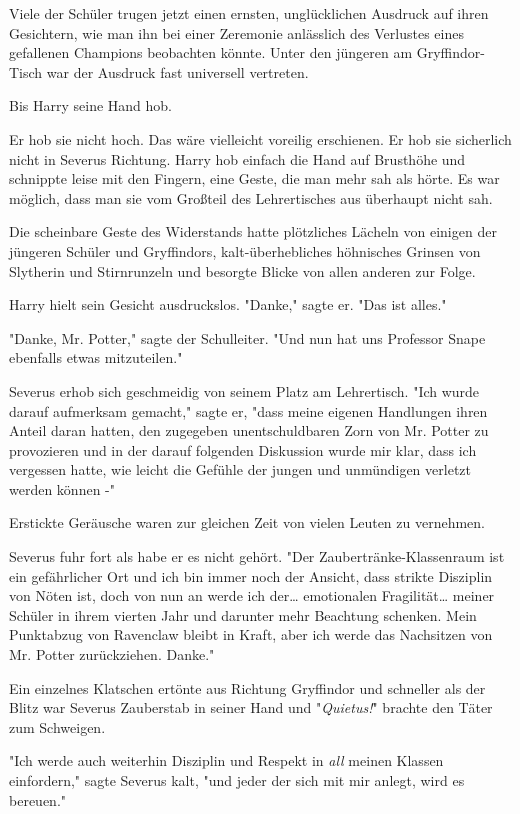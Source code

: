 {Viele der Schüler trugen jetzt einen ernsten, unglücklichen Ausdruck auf ihren Gesichtern, wie man ihn bei einer Zeremonie anlässlich des Verlustes eines gefallenen Champions beobachten könnte. Unter den jüngeren am Gryffindor-Tisch war der Ausdruck fast universell vertreten.

Bis Harry seine Hand hob.

Er hob sie nicht hoch. Das wäre vielleicht voreilig erschienen. Er hob sie sicherlich nicht in Severus Richtung. Harry hob einfach die Hand auf Brusthöhe und schnippte leise mit den Fingern, eine Geste, die man mehr sah als hörte. Es war möglich, dass man sie vom Großteil des Lehrertisches aus überhaupt nicht sah.

Die scheinbare Geste des Widerstands hatte plötzliches Lächeln von einigen der jüngeren Schüler und Gryffindors, kalt-überhebliches höhnisches Grinsen von Slytherin und Stirnrunzeln und besorgte Blicke von allen anderen zur Folge.

Harry hielt sein Gesicht ausdruckslos. "Danke," sagte er. "Das ist alles."

"Danke, Mr. Potter," sagte der Schulleiter. "Und nun hat uns Professor Snape ebenfalls etwas mitzuteilen."

Severus erhob sich geschmeidig von seinem Platz am Lehrertisch. "Ich wurde darauf aufmerksam gemacht," sagte er, "dass meine eigenen Handlungen ihren Anteil daran hatten, den zugegeben unentschuldbaren Zorn von Mr. Potter zu provozieren und in der darauf folgenden Diskussion wurde mir klar, dass ich vergessen hatte, wie leicht die Gefühle der jungen und unmündigen verletzt werden können -"

Erstickte Geräusche waren zur gleichen Zeit von vielen Leuten zu vernehmen.

Severus fuhr fort als habe er es nicht gehört. "Der Zaubertränke-Klassenraum ist ein gefährlicher Ort und ich bin immer noch der Ansicht, dass strikte Disziplin von Nöten ist, doch von nun an werde ich der… emotionalen Fragilität… meiner Schüler in ihrem vierten Jahr und darunter mehr Beachtung schenken. Mein Punktabzug von Ravenclaw bleibt in Kraft, aber ich werde das Nachsitzen von Mr. Potter zurückziehen. Danke."

Ein einzelnes Klatschen ertönte aus Richtung Gryffindor und schneller als der Blitz war Severus Zauberstab in seiner Hand und "\emph{Quietus!}" brachte den Täter zum Schweigen.

"Ich werde auch weiterhin Disziplin und Respekt in \emph{all} meinen Klassen einfordern," sagte Severus kalt, "und jeder der sich mit mir anlegt, wird es bereuen."

}
